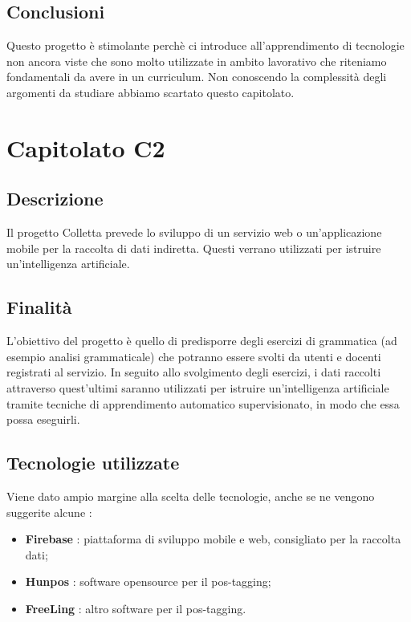         \subsection{Conclusioni}
            Questo progetto è stimolante perchè ci introduce all'apprendimento di tecnologie non ancora viste che sono molto utilizzate in ambito lavorativo che riteniamo fondamentali da avere in un curriculum.
            Non conoscendo la complessità degli argomenti da studiare abbiamo scartato questo capitolato. 
           
		
\newpage
        \section{Capitolato C2}
            \subsection{Descrizione}
                Il progetto Colletta prevede lo sviluppo di un servizio web o un'applicazione mobile per la raccolta di dati indiretta. Questi verrano utilizzati per istruire un'intelligenza artificiale.
            \subsection{Finalità}
                L'obiettivo del progetto è quello di predisporre degli esercizi di grammatica (ad esempio analisi grammaticale) che potranno essere svolti da utenti e docenti registrati al servizio.
                In seguito allo svolgimento degli esercizi, i dati raccolti attraverso quest'ultimi saranno utilizzati per istruire un'intelligenza artificiale tramite tecniche di apprendimento automatico supervisionato, in modo che essa possa eseguirli.
            \subsection{Tecnologie utilizzate}
                Viene dato ampio margine alla scelta delle tecnologie, anche se ne vengono suggerite alcune :
                \begin{itemize} 
                    \item \textbf{Firebase} : piattaforma di sviluppo mobile e web, consigliato per la raccolta dati;
                    \item \textbf{Hunpos} : software opensource per il pos-tagging;
                    \item \textbf{FreeLing} : altro software per il pos-tagging.
				\end{itemize} 
